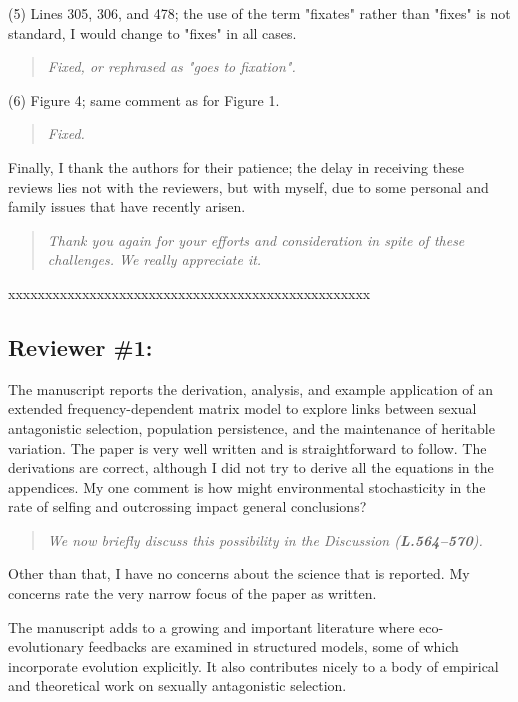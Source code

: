 \documentclass[11pt]{article}
\begin{document}
\noindent (5) Lines 305, 306, and 478; the use of the term "fixates" rather than "fixes" is not standard, I would change to "fixes" in all cases.
\begin{quote}
	{\itshape Fixed, or rephrased as "goes to fixation".}
\end{quote}

\noindent (6) Figure 4; same comment as for Figure 1.
\begin{quote}
	{\itshape Fixed.}
\end{quote}

Finally, I thank the authors for their patience; the delay in receiving these reviews lies not with the reviewers, but with myself, due to some personal and family issues that have recently arisen.

\begin{quote}
	{\itshape Thank you again for your efforts and consideration in spite of these challenges. We really appreciate it.}
\end{quote}


\noindent xxxxxxxxxxxxxxxxxxxxxxxxxxxxxxxxxxxxxxxxxxxxxxxxx

\subsection*{Reviewer \#1:}

The manuscript reports the derivation, analysis, and example application of an extended frequency-dependent matrix model to explore links between sexual antagonistic selection, population persistence, and the maintenance of heritable variation. The paper is very well written and is straightforward to follow. The derivations are correct, although I did not try to derive all the equations in the appendices. My one comment is how might environmental stochasticity in the rate of selfing and outcrossing impact general conclusions? 
\begin{quote}
	{\itshape We now briefly discuss this possibility in the Discussion ({\bf L.564--570}).}
\end{quote}


Other than that, I have no concerns about the science that is reported. My concerns rate the very narrow focus of the paper as written.

The manuscript adds to a growing and important literature where eco-evolutionary feedbacks are examined in structured models, some of which incorporate evolution explicitly. It also contributes nicely to a body of empirical and theoretical work on sexually antagonistic selection.
\end{document}
